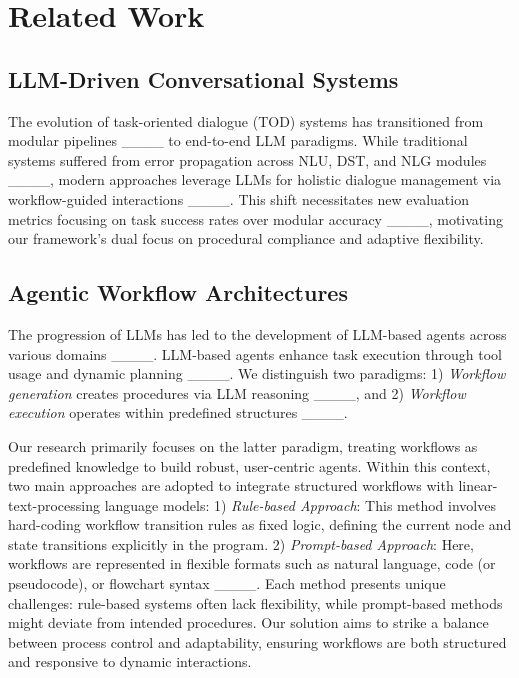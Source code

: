 \section{Related Work}
\subsection{LLM-Driven Conversational Systems} \label{subsec:llm-tod} 
The evolution of task-oriented dialogue (TOD) systems has transitioned from modular pipelines ____ to end-to-end LLM paradigms. While traditional systems suffered from error propagation across NLU, DST, and NLG modules ____, modern approaches leverage LLMs for holistic dialogue management via workflow-guided interactions ____. 
This shift necessitates new evaluation metrics focusing on task success rates over modular accuracy ____, motivating our framework's dual focus on procedural compliance and adaptive flexibility.


\subsection{Agentic Workflow Architectures} 
The progression of LLMs has led to the development of LLM-based agents across various domains ____.
LLM-based agents enhance task execution through tool usage and dynamic planning ____. We distinguish two paradigms: 1) \emph{Workflow generation} creates procedures via LLM reasoning ____, and 2) \emph{Workflow execution} operates within predefined structures ____. 

Our research primarily focuses on the latter paradigm, treating workflows as predefined knowledge to build robust, user-centric agents. Within this context, two main approaches are adopted to integrate structured workflows with linear-text-processing language models: 
1) \emph{Rule-based Approach}: This method involves hard-coding workflow transition rules as fixed logic, defining the current node and state transitions explicitly in the program.
2) \emph{Prompt-based Approach}: Here, workflows are represented in flexible formats such as natural language, code (or pseudocode), or flowchart syntax ____.
Each method presents unique challenges: rule-based systems often lack flexibility, while prompt-based methods might deviate from intended procedures. Our solution aims to strike a balance between process control and adaptability, ensuring workflows are both structured and responsive to dynamic interactions.